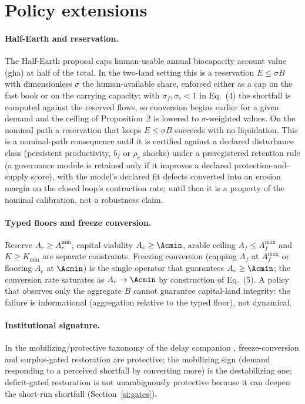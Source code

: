 \section{Policy extensions}\label{si:policy}

\paragraph{Half-Earth and reservation.} The Half-Earth proposal \citep{Wilson2016} caps human-usable annual biocapacity account value (gha) at half of the total. In the two-land setting this is a reservation $E\le\sigma B$ with dimensionless $\sigma$ the human-available share, enforced either as a cap on the fast book or on the carrying capacity; with $\sigma_f,\sigma_c<1$ in Eq.~(4) the shortfall is computed against the reserved flows, so conversion begins earlier for a given demand and the ceiling of Proposition~2 is lowered to $\sigma$-weighted values. On the nominal path a reservation that keeps $E\le\sigma B$ succeeds with no liquidation. This is a nominal-path consequence until it is certified against a declared disturbance class (persistent productivity, $b_f$ or $\rho_c$ shocks) under a preregistered retention rule (a governance module is retained only if it improves a declared protection-and-supply score), with the model's declared fit defects converted into an erosion margin on the closed loop's contraction rate; until then it is a property of the nominal calibration, not a robustness claim.

\paragraph{Typed floors and freeze conversion.} Reserve $A_r\ge A_r^{\min}$, capital viability $A_c\ge\Acmin$, arable ceiling $A_f\le A_f^{\max}$ and $K\ge K_{\min}$ are separate constraints. Freezing conversion (capping $A_f$ at $A_f^{\max}$ or flooring $A_c$ at $\Acmin$) is the single operator that guarantees $A_c\ge\Acmin$; the conversion rate saturates as $A_c\to\Acmin$ by construction of Eq.~(5). A policy that observes only the aggregate $B$ cannot guarantee capital-land integrity: the failure is informational (aggregation relative to the typed floor), not dynamical.

\paragraph{Institutional signature.} In the mobilizing/protective taxonomy of the delay companion \citep{Abaee2026a}, freeze-conversion and surplus-gated restoration are protective; the mobilizing sign (demand responding to a perceived shortfall by converting more) is the destabilizing one; deficit-gated restoration is not unambiguously protective because it can deepen the short-run shortfall (Section~\ref{si:gates}).

